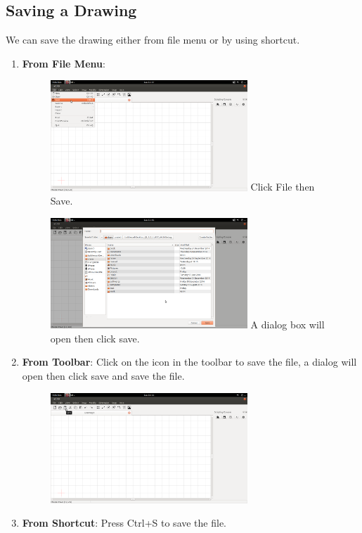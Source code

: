 \subsection{Saving a Drawing}
We can save the drawing either from file menu or by using shortcut.
\begin{enumerate}
\item \textbf{From File Menu}:
\begin{figure}[h!]
\centering
\includegraphics[width=0.7\textwidth]{images/filesave.png}
Click File then Save.
\end{figure}
 \begin{figure}[h!]
 \centering
  \includegraphics[width=0.7\textwidth]{images/savedialog.png}
A dialog box will open then click save.
\end{figure}
\item \textbf{From Toolbar}: Click on the icon in the toolbar to save the file, a dialog will open then click save and save the file.
\begin{figure}[h!]
\centering
\includegraphics[width=0.7\textwidth]{images/toolsave.png}\\
\end{figure}
\item \textbf{From Shortcut}: Press Ctrl+S to save the file.
\end{enumerate}
\newpage
